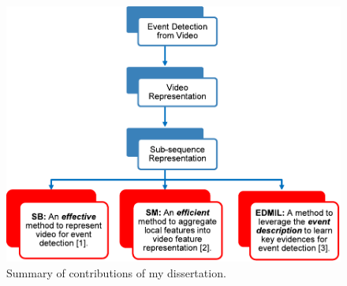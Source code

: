\begin{figure}
	\centering
	\includegraphics[width=1\textwidth]{contribution.pdf}
	\caption{Summary of contributions of my dissertation.}
	\label{c6_contribution}
\end{figure}

